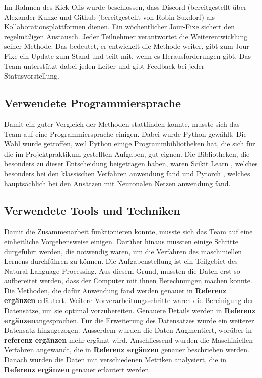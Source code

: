 Im Rahmen des Kick-Offs wurde beschlossen, dass Discord (bereitgestellt über Alexander Kunze und Github (bereitgestellt von Robin Suxdorf) als Kollaborationsplattformen dienen. Ein wöchentlicher Jour-Fixe sichert den regelmäßigen Austausch. Jeder Teilnehmer verantwortet die Weiterentwicklung seiner Methode. Das bedeutet, er entwickelt die Methode weiter, gibt zum Jour-Fixe ein Update zum Stand und teilt mit, wenn es Herausforderungen gibt. Das Team unterstützt dabei jeden Leiter und gibt Feedback bei jeder Statusvorstellung.


\subsection{Verwendete Programmiersprache}
Damit ein guter Vergleich der Methoden stattfinden konnte, musste sich das Team auf eine Programmiersprache einigen. Dabei wurde Python gewählt. Die Wahl wurde getroffen, weil Python einige Programmbibliotheken hat, die sich für die im Projektpraktikum gestellten Aufgaben, gut eignen. Die Bibliotheken, die besonders zu dieser Entscheidung beigetragen haben, waren Scikit Learn \cite{skicitLearnRef}, welches besonders bei den klassischen Verfahren anwendung fand und Pytorch \cite{pytorchRef}, welches hauptsächlich bei den Ansätzen mit Neuronalen Netzen anwendung fand.

\subsection{Verwendete Tools und Techniken}
Damit die Zusammenarbeit funktionieren konnte, musste sich das Team auf eine einheitliche Vorgehensweise einigen. Darüber hinaus mussten einige Schritte durgeführt werden, die notwendig waren, um die Verfahren des maschiniellen Lernens durchführen zu können. Die Aufgabenstellung ist ein Teilgebiet des Natural Language Processing. Aus diesem Grund, mussten die Daten erst so aufbereitet werden, dass der Computer mit ihnen Berechnungen machen konnte. Die Methoden, die dafür Anwendung fand werden genauer in \textbf{Referenz ergänzen} erläutert. Weitere Vorverarbeitungsschritte waren die Bereinigung der Datensätze, um sie optimal vorzubereiten. Genauere Details werden in \textbf{Referenz ergänzen}angesprochen. Für die Erweiterung des Datensatzes wurde ein weiterer Datensatz hinzugezogen. Ausserdem wurden die Daten Augmentiert, worüber in \textbf{referenz ergänzen} mehr ergänzt wird. Anschliessend wurden die Maschiniellen Verfahren angewandt, die in \textbf{Referenz ergänzen} genauer beschrieben werden. Danach wurden die Daten mit verschiedenen Metriken analysiert, die in \textbf{Referenz ergänzen} genauer erläutert werden.